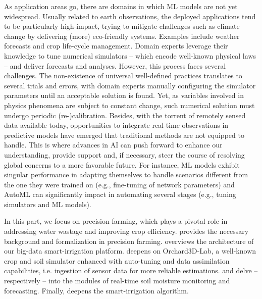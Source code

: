 \documentclass[a4paper,12pt,times,numbered,print,index]{Classes/PhDThesisPSnPDF}
\begin{document}
As application areas go, there are domains in which ML models are not yet widespread.
Usually related to earth observations, the deployed applications tend to be particularly high-impact, trying to mitigate challenges such as climate change by delivering (more) eco-friendly systems.
Examples include weather forecasts and crop life-cycle management.
Domain experts leverage their knowledge to tune numerical simulators -- which encode well-known physical laws -- and deliver forecasts and analyses.
However, this process faces several challenges.
The non-existence of universal well-defined practices translates to several trials and errors, with domain experts manually configuring the simulator parameters until an acceptable solution is found.
Yet, as variables involved in physics phenomena are subject to constant change, such numerical solution must undergo periodic (re-)calibration.
Besides, with the torrent of remotely sensed data available today, opportunities to integrate real-time observations in predictive models have emerged that traditional methods are not equipped to handle.
This is where advances in AI can push forward to enhance our understanding, provide support and, if necessary, steer the course of resolving global concerns to a more favorable future.
For instance, ML models exhibit singular performance in adapting themselves to handle scenarios different from the one they were trained on (e.g., fine-tuning of network parameters) and AutoML can significantly impact in automating several stages (e.g., tuning simulators and ML models).

In this part, we focus on precision farming, which plays a pivotal role in addressing water wastage and improving crop efficiency.
 provides the necessary background and formalization in precision farming.
 overviews the architecture of our big-data smart-irrigation platform.
 deepens on Orchard3D-Lab, a well-known crop and soil simulator enhanced with auto-tuning and data assimilation capabilities, i.e. ingestion of sensor data for more reliable estimations.
 and  delve -- respectively -- into the modules of real-time soil moisture monitoring and forecasting.
Finally,  deepens the smart-irrigation algorithm.
\end{document}
